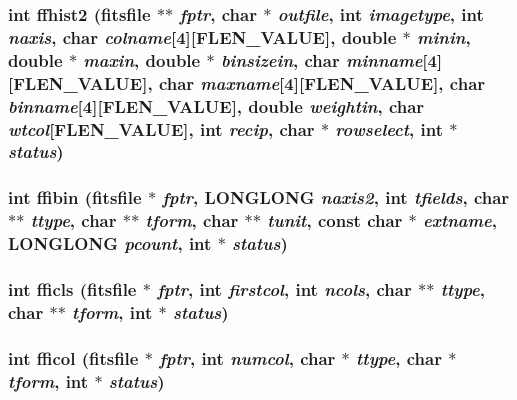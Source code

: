 \subsubsection{\setlength{\rightskip}{0pt plus 5cm}int ffhist2 (\bf{fitsfile} $\ast$$\ast$ {\em fptr}, char $\ast$ {\em outfile}, int {\em imagetype}, int {\em naxis}, char {\em colname}[4][FLEN\_\-VALUE], double $\ast$ {\em minin}, double $\ast$ {\em maxin}, double $\ast$ {\em binsizein}, char {\em minname}[4][FLEN\_\-VALUE], char {\em maxname}[4][FLEN\_\-VALUE], char {\em binname}[4][FLEN\_\-VALUE], double {\em weightin}, char {\em wtcol}[FLEN\_\-VALUE], int {\em recip}, char $\ast$ {\em rowselect}, int $\ast$ {\em status})}\label{src_2fitsio_8h_82fd106b8fa747b8b0895c6f1419c328}


\subsubsection{\setlength{\rightskip}{0pt plus 5cm}int ffibin (\bf{fitsfile} $\ast$ {\em fptr}, \bf{LONGLONG} {\em naxis2}, int {\em tfields}, char $\ast$$\ast$ {\em ttype}, char $\ast$$\ast$ {\em tform}, char $\ast$$\ast$ {\em tunit}, const char $\ast$ {\em extname}, \bf{LONGLONG} {\em pcount}, int $\ast$ {\em status})}\label{src_2fitsio_8h_a58067cf409aa0fa133a4794c43264a3}


\subsubsection{\setlength{\rightskip}{0pt plus 5cm}int fficls (\bf{fitsfile} $\ast$ {\em fptr}, int {\em firstcol}, int {\em ncols}, char $\ast$$\ast$ {\em ttype}, char $\ast$$\ast$ {\em tform}, int $\ast$ {\em status})}\label{src_2fitsio_8h_cd1a0072dd0c525e2263eb781403f1eb}


\subsubsection{\setlength{\rightskip}{0pt plus 5cm}int fficol (\bf{fitsfile} $\ast$ {\em fptr}, int {\em numcol}, char $\ast$ {\em ttype}, char $\ast$ {\em tform}, int $\ast$ {\em status})}\label{src_2fitsio_8h_bbf8d6634ce0e3a4c6446730f4fae58a}


